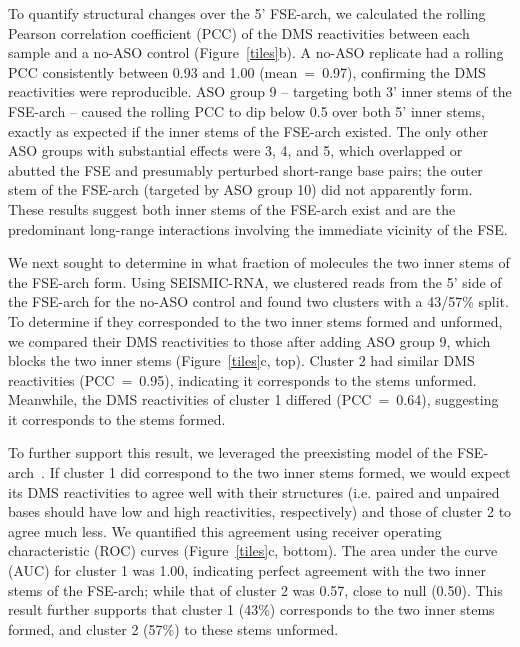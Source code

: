 \documentclass[main.tex]{subfiles}
\begin{document}
To quantify structural changes over the 5' FSE-arch, we calculated the rolling Pearson correlation coefficient (PCC) of the DMS reactivities between each sample and a no-ASO control (Figure~\ref{tiles}b).
A no-ASO replicate had a rolling PCC consistently between 0.93 and 1.00 (mean~=~0.97), confirming the DMS reactivities were reproducible.
ASO group 9 -- targeting both 3' inner stems of the FSE-arch -- caused the rolling PCC to dip below 0.5 over both 5' inner stems, exactly as expected if the inner stems of the FSE-arch existed.
The only other ASO groups with substantial effects were 3, 4, and 5, which overlapped or abutted the FSE and presumably perturbed short-range base pairs; the outer stem of the FSE-arch (targeted by ASO group 10) did not apparently form.
These results suggest both inner stems of the FSE-arch exist and are the predominant long-range interactions involving the immediate vicinity of the FSE.

We next sought to determine in what fraction of molecules the two inner stems of the FSE-arch form.
Using SEISMIC-RNA, we clustered reads from the 5' side of the FSE-arch for the no-ASO control and found two clusters with a 43/57\% split.
To determine if they corresponded to the two inner stems formed and unformed, we compared their DMS reactivities to those after adding ASO group 9, which blocks the two inner stems (Figure~\ref{tiles}c, top).
Cluster 2 had similar DMS reactivities (PCC~=~0.95), indicating it corresponds to the stems unformed.
Meanwhile, the DMS reactivities of cluster 1 differed (PCC~=~0.64), suggesting it corresponds to the stems formed.

To further support this result, we leveraged the preexisting model of the FSE-arch~\cite{Ziv2020}.
If cluster 1 did correspond to the two inner stems formed, we would expect its DMS reactivities to agree well with their structures (i.e. paired and unpaired bases should have low and high reactivities, respectively) and those of cluster 2 to agree much less.
We quantified this agreement using receiver operating characteristic (ROC) curves (Figure~\ref{tiles}c, bottom).
The area under the curve (AUC) for cluster 1 was 1.00, indicating perfect agreement with the two inner stems of the FSE-arch; while that of cluster 2 was 0.57, close to null (0.50).
This result further supports that cluster 1 (43\%) corresponds to the two inner stems formed, and cluster 2 (57\%) to these stems unformed.
\end{document}
